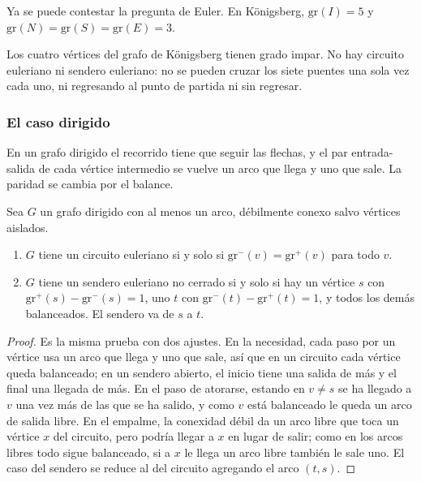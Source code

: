 \documentclass[11pt,letterpaper]{article}
\begin{document}
Ya se puede contestar la pregunta de Euler. En Königsberg,
$\text{gr}(I) = 5$ y $\text{gr}(N) = \text{gr}(S) = \text{gr}(E) = 3$.

\begin{resultado}
  Los cuatro vértices del grafo de Königsberg tienen grado impar. No
  hay circuito euleriano ni sendero euleriano: no se pueden cruzar los
  siete puentes una sola vez cada uno, ni regresando al punto de
  partida ni sin regresar.
\end{resultado}

\subsubsection*{El caso dirigido}

En un grafo dirigido el recorrido tiene que seguir las flechas, y el
par entrada-salida de cada vértice intermedio se vuelve un arco que
llega y uno que sale. La paridad se cambia por el balance.

\begin{teorema}
  \label{teo:euler-dirigido}
  Sea $G$ un grafo dirigido con al menos un arco, débilmente conexo
  salvo vértices aislados.
  \begin{enumerate}[itemsep=0.1em]
    \item $G$ tiene un circuito euleriano si y solo si
          $\text{gr}^{-}(v) = \text{gr}^{+}(v)$ para todo $v$.
    \item $G$ tiene un sendero euleriano no cerrado si y solo si hay un
          vértice $s$ con $\text{gr}^{+}(s) - \text{gr}^{-}(s) = 1$, uno
          $t$ con $\text{gr}^{-}(t) - \text{gr}^{+}(t) = 1$, y todos
          los demás balanceados. El sendero va de $s$ a $t$.
  \end{enumerate}
\end{teorema}

\begin{proof}
  Es la misma prueba con dos ajustes. En la necesidad, cada paso por
  un vértice usa un arco que llega y uno que sale, así que en un
  circuito cada vértice queda balanceado; en un sendero abierto, el
  inicio tiene una salida de más y el final una llegada de más. En el
  paso de atorarse, estando en $v \neq s$ se ha llegado a $v$ una vez
  más de las que se ha salido, y como $v$ está balanceado le queda un
  arco de salida libre. En el empalme, la conexidad débil da un arco
  libre que toca un vértice $x$ del circuito, pero podría llegar a $x$
  en lugar de salir; como en los arcos libres todo sigue balanceado,
  si a $x$ le llega un arco libre también le sale uno. El caso del
  sendero se reduce al del circuito agregando el arco $(t, s)$.
\end{proof}
\end{document}
